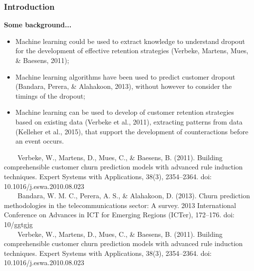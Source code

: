 \documentclass[10pt]{beamer}
\begin{document}
\begin{frame}
	\frametitle{Introduction}
	\Large
	\textbf{Some background...}\\
		\begin{itemize} \normalsize
			\item Machine learning could be used to extract knowledge to understand dropout for the development of effective retention strategies \footnotesize(Verbeke, Martens, Mues, \& Baesens, 2011)\normalsize;
			\item Machine learning algorithms have been used to predict customer dropout \footnotesize(Bandara, Perera, \& Alahakoon, 2013)\normalsize, without however to consider the timings of the dropout;
			\item Machine learning can be used to develop of customer retention strategies based on existing data \footnotesize(Verbeke et al., 2011)\normalsize, extracting patterns from data \footnotesize(Kelleher et al., 2015)\normalsize, that support the development of counteractions before an event occurs.
		\end{itemize}	
	\tiny
	~~~~Verbeke, W., Martens, D., Mues, C., \& Baesens, B. (2011). Building comprehensible customer churn prediction models with advanced rule induction techniques. Expert Systems with Applications, 38(3), 2354–2364. doi: 10.1016/j.eswa.2010.08.023 \\
	~~~~Bandara, W. M. C., Perera, A. S., \& Alahakoon, D. (2013). Churn prediction methodologies in the telecommunications sector: A survey. 2013 International Conference on Advances in ICT for Emerging Regions (ICTer), 172–176. doi: 10/ggtgjg\\
	~~~~Verbeke, W., Martens, D., Mues, C., \& Baesens, B. (2011). Building comprehensible customer churn prediction models with advanced rule induction techniques. Expert Systems with Applications, 38(3), 2354–2364. doi: 10.1016/j.eswa.2010.08.023\\
\end{frame}
\end{document}
